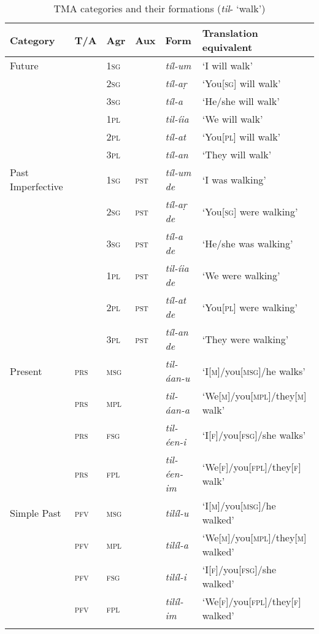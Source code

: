 \begin{sidewaystable}[p!]
\caption{TMA categories and their formations (\textit{til}- `walk')}
\begin{tabularx}{\textwidth}{ l l l l l l }
\lsptoprule
Category &
T/A &
Agr &
Aux &
Form &
Translation equivalent\\\midrule
Future &
&
\textsc{1sg} &
&
\textit{tíl-um} &
`I will walk' \\
&
&
\textsc{2sg} &
&
\textit{tíl-aṛ} &
`You[\textsc{sg}] will walk' \\
&
&
\textsc{3sg} &
&
\textit{tíl-a} &
`He/she will walk' \\
&
&
\textsc{1pl} &
&
\textit{til-íia} &
`We will walk' \\
&
&
\textsc{2pl} &
&
\textit{tíl-at} &
`You[\textsc{pl}] will walk' \\
&
&
\textsc{3pl} &
&
\textit{tíl-an} &
`They will walk' \\
Past Imperfective &
&
\textsc{1sg} &
\textsc{pst} &
\textit{tíl-um de} &
`I was walking' \\
&
&
\textsc{2sg} &
\textsc{pst} &
\textit{tíl-aṛ de} &
`You[\textsc{sg}] were walking' \\
&
&
\textsc{3sg} &
\textsc{pst} &
\textit{tíl-a de} &
`He/she was walking' \\
&
&
\textsc{1pl} &
\textsc{pst} &
\textit{til-íia de} &
`We were walking' \\
&
&
\textsc{2pl} &
\textsc{pst} &
\textit{tíl-at de} &
`You[\textsc{pl}] were walking' \\
&
&
\textsc{3pl} &
\textsc{pst} &
\textit{tíl-an de} &
`They were walking' \\
Present &
\textsc{prs} &
\textsc{msg} &
&
\textit{til-áan-u} &
`I[\textsc{m}]/you[\textsc{msg}]/he walks' \\
&
\textsc{prs} &
\textsc{mpl} &
&
\textit{til-áan-a} &
`We[\textsc{m}]/you[\textsc{mpl}]/they[\textsc{m}] walk' \\
&
\textsc{prs} &
\textsc{fsg} &
&
\textit{til-éen-i} &
`I[\textsc{f}]/you[\textsc{fsg}]/she walks' \\
&
\textsc{prs} &
\textsc{fpl} &
&
\textit{til-éen-im} &
`We[\textsc{f}]/you[\textsc{fpl}]/they[\textsc{f}] walk' \\
Simple Past &
\textsc{pfv} &
\textsc{msg} &
&
\textit{tilíl-u} &
`I[\textsc{m}]/you[\textsc{msg}]/he walked' \\
&
\textsc{pfv} &
\textsc{mpl} &
&
\textit{tilíl-a} &
`We[\textsc{m}]/you[\textsc{mpl}]/they[\textsc{m}] walked' \\
&
\textsc{pfv} &
\textsc{fsg} &
&
\textit{tilíl-i} &
`I[\textsc{f}]/you[\textsc{fsg}]/she walked' \\
&
\textsc{pfv} &
\textsc{fpl} &
&
\textit{tilíl-im} &
`We[\textsc{f}]/you[\textsc{fpl}]/they[\textsc{f}] walked' 
\\\lspbottomrule
\end{tabularx}
\end{sidewaystable}

